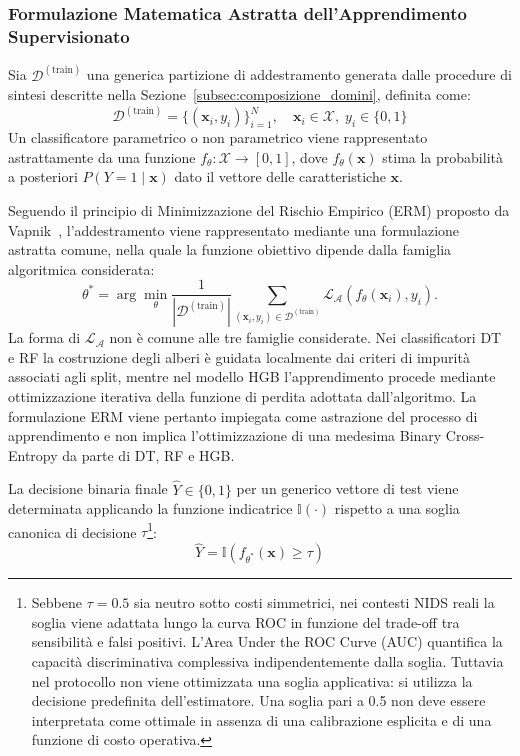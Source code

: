 \subsubsection{Formulazione Matematica Astratta dell'Apprendimento Supervisionato}
\label{subsubsec:formulazione_erm}
Sia $\mathcal{D}^{(\text{train})}$ una generica partizione di addestramento generata dalle procedure di sintesi descritte nella Sezione~\ref{subsec:composizione_domini}, definita come:
\begin{equation}
    \mathcal{D}^{(\text{train})} = \{(\mathbf{x}_i, y_i)\}_{i=1}^N, \quad \mathbf{x}_i \in \mathcal{X}, \; y_i \in \{0, 1\}
    \label{eq:train_partition_def}
\end{equation}
Un classificatore parametrico o non parametrico viene rappresentato astrattamente da una funzione $f_\theta: \mathcal{X} \rightarrow [0, 1]$, dove $f_\theta(\mathbf{x})$ stima la probabilità a posteriori $P(Y = 1 \mid \mathbf{x})$ dato il vettore delle caratteristiche $\mathbf{x}$.

Seguendo il principio di Minimizzazione del Rischio Empirico (ERM) proposto da Vapnik~\cite{vapnik1998}, l'addestramento viene rappresentato mediante una formulazione astratta comune, nella quale la funzione obiettivo dipende dalla famiglia algoritmica considerata:
\begin{equation}
    \theta^* =
    \arg\min_{\theta}
    \frac{1}{|\mathcal{D}^{(\text{train})}|}
    \sum_{(\mathbf{x}_i,y_i)\in\mathcal{D}^{(\text{train})}}
    \mathcal{L}_{\mathcal{A}}\left(f_\theta(\mathbf{x}_i),y_i\right).
    \label{eq:erm_abstract}
\end{equation}
La forma di $\mathcal{L}_{\mathcal{A}}$ non è comune alle tre famiglie considerate. Nei classificatori DT e RF la costruzione degli alberi è guidata localmente dai criteri di impurità associati agli split, mentre nel modello HGB l'apprendimento procede mediante ottimizzazione iterativa della funzione di perdita adottata dall'algoritmo. La formulazione ERM viene pertanto impiegata come astrazione del processo di apprendimento e non implica l'ottimizzazione di una medesima Binary Cross-Entropy da parte di DT, RF e HGB.

La decisione binaria finale $\hat{Y} \in \{0, 1\}$ per un generico vettore di test viene determinata applicando la funzione indicatrice $\mathbb{I}(\cdot)$ rispetto a una soglia canonica di decisione $\tau$\footnote{Sebbene $\tau = 0.5$ sia neutro sotto costi simmetrici, nei contesti NIDS reali la soglia viene adattata lungo la curva ROC in funzione del trade-off tra sensibilità e falsi positivi. L'Area Under the ROC Curve (AUC) quantifica la capacità discriminativa complessiva indipendentemente dalla soglia. Tuttavia nel protocollo non viene ottimizzata una soglia applicativa: si utilizza la decisione predefinita dell'estimatore. Una soglia pari a 0.5 non deve essere interpretata come ottimale in assenza di una calibrazione esplicita e di una funzione di costo operativa.}: 
\begin{equation}
    \hat{Y} = \mathbb{I}\left(f_{\theta^*}(\mathbf{x}) \ge \tau\right)
    \label{eq:binary_decision}
\end{equation}

